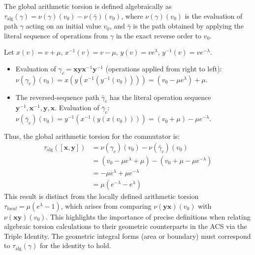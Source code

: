\documentclass[12pt, a4paper]{article}
\theoremstyle{definition}
\begin{document}
The global arithmetic torsion is defined algebraically as $\tau_{\text{alg}}(\gamma) = \nu(\gamma)(v_0) - \nu(\bar{\gamma})(v_0)$, where $\nu(\gamma)(v_0)$ is the evaluation of path $\gamma$ acting on an initial value $v_0$, and $\bar{\gamma}$ is the path obtained by applying the literal sequence of operations from $\gamma$ in the exact reverse order to $v_0$.

Let $x(v) = v + \mu$, $x^{-1}(v) = v - \mu$, $y(v) = v e^\lambda$, $y^{-1}(v) = v e^{-\lambda}$.
\begin{itemize}
    \item Evaluation of $\gamma_c = \mathbf{x}\mathbf{y}\mathbf{x}^{-1}\mathbf{y}^{-1}$ (operations applied from right to left):
    $\nu(\gamma_c)(v_0) = x(y(x^{-1}(y^{-1}(v_0)))) = (v_0 - \mu e^\lambda) + \mu$.
    \item The reversed-sequence path $\bar{\gamma}_c$ has the literal operation sequence $\mathbf{y}^{-1}, \mathbf{x}^{-1}, \mathbf{y}, \mathbf{x}$.
    Evaluation of $\bar{\gamma}_c$:
    $\nu(\bar{\gamma}_c)(v_0) = y^{-1}(x^{-1}(y(x(v_0)))) = (v_0 + \mu) - \mu e^{-\lambda}$.
\end{itemize}
Thus, the global arithmetic torsion for the commutator is:
\begin{align*}
\tau_{\text{alg}}([\mathbf{x},\mathbf{y}]) &= \nu(\gamma_c)(v_0) - \nu(\bar{\gamma}_c)(v_0) \\
&= (v_0 - \mu e^\lambda + \mu) - (v_0 + \mu - \mu e^{-\lambda}) \\
&= -\mu e^\lambda + \mu e^{-\lambda} \\
&= \mu (e^{-\lambda} - e^\lambda)
\end{align*}
This result is distinct from the locally defined arithmetic torsion $\tau_{local} = \mu(e^\lambda - 1)$, which arises from comparing $\nu(\mathbf{y}\mathbf{x})(v_0)$ with $\nu(\mathbf{x}\mathbf{y})(v_0)$. This highlights the importance of precise definitions when relating algebraic torsion calculations to their geometric counterparts in the ACS via the Triple Identity. The geometric integral forms (area or boundary) must correspond to $\tau_{\text{alg}}(\gamma)$ for the identity to hold.
\end{document}

